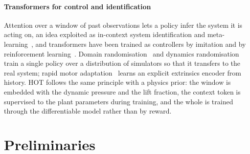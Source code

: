 \documentclass[final,5p,times,twocolumn]{elsarticle}
\begin{document}
\paragraph{Transformers for control and identification} Attention over a window of past observations lets a policy infer the system it is acting on, an idea exploited as in-context system identification and meta-learning~\cite{Chen2021DT,Lee2023}, and transformers have been trained as controllers by imitation and by reinforcement learning~\cite{Chen2021DT,Janner2021}. Domain randomisation~\cite{Tobin2017} and dynamics randomisation~\cite{Peng2018} train a single policy over a distribution of simulators so that it transfers to the real system; rapid motor adaptation~\cite{Kumar2021} learns an explicit extrinsics encoder from history. HOT follows the same principle with a physics prior: the window is embedded with the dynamic pressure and the lift fraction, the context token is supervised to the plant parameters during training, and the whole is trained through the differentiable model rather than by reward.



\section{Preliminaries}\label{sec:prelim}
\end{document}
